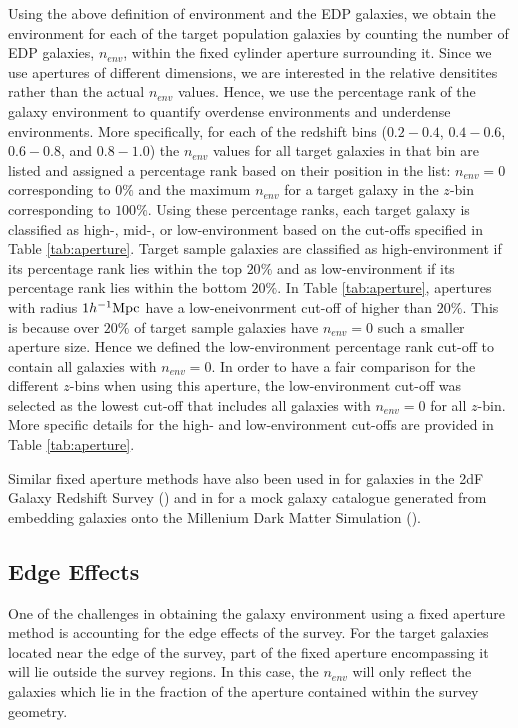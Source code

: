 \documentclass{emulateapj}
\begin{document}
Using the above definition of environment and the EDP galaxies, we obtain the environment for each of the target population galaxies by counting the number of EDP galaxies, 
$n_{env}$, within the fixed cylinder aperture surrounding it. 
Since we use apertures of different dimensions, we are interested in the relative densitites rather than the actual $n_{env}$ values.
Hence, we use the percentage rank of the galaxy environment to quantify overdense environments and underdense environments.
More specifically, for each of the redshift bins ($0.2-0.4$, $0.4-0.6$, $0.6-0.8$, and $0.8-1.0$) the $n_{env}$ values for all target galaxies in that bin are listed and assigned a percentage rank based on their position in the list: $n_{env} = 0$ corresponding to $0\%$ and the maximum $n_{env}$ for a target galaxy in the $z$-bin corresponding to $100\%$. 
Using these percentage ranks, each target galaxy is classified as high-, mid-, or low-environment based on the cut-offs specified in Table \ref{tab:aperture}. 
Target sample galaxies are classified as high-environment if its percentage rank lies within the top $20\%$ and as low-environment if its percentage rank lies within the bottom $20\%$. 
In Table \ref{tab:aperture}, apertures with radius $1 h^{-1} \rm{Mpc}$ have a low-eneivonrment cut-off of higher than $20\%$.
This is because over $20\%$ of target sample galaxies have $n_{env}=0$ such a smaller aperture size.
Hence we defined the low-environment percentage rank cut-off to contain all galaxies with $n_{env}=0$. 
In order to have a fair comparison for the different $z$-bins when using this aperture, the low-environment cut-off was selected as the lowest cut-off that includes all galaxies with $n_{env}=0$ for all $z$-bin.
More specific details for the high- and low-environment cut-offs are provided in Table \ref{tab:aperture}.

Similar fixed aperture methods have also been used in \cite{Croton:2005aa} for galaxies in the 2dF Galaxy Redshift Survey (\cite{Colless:2003aa}) and in \cite{Muldrew:2012aa} 
for a mock galaxy catalogue generated from embedding galaxies onto the Millenium Dark Matter Simulation (\cite{Springel:2005aa}). 

\subsection{Edge Effects} \label{sec:edgeeffect}
One of the challenges in obtaining the galaxy environment using a fixed aperture method is accounting for the edge effects of the survey.
For the target galaxies located near the edge of the survey, part of the fixed aperture encompassing it will lie outside the survey regions. 
In this case, the $n_{env}$ will only reflect the galaxies which lie in the fraction of the aperture contained within the survey geometry.
\end{document}

